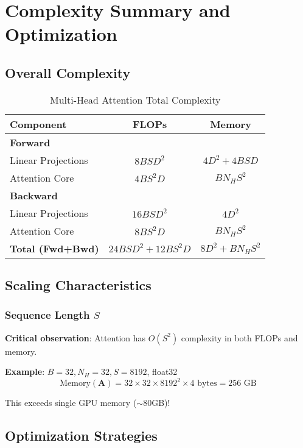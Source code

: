 \documentclass[10pt]{article}
\begin{document}
\section{Complexity Summary and Optimization}
\label{sec:summary}

\subsection{Overall Complexity}

\begin{table}[h]
\centering
\caption{Multi-Head Attention Total Complexity}
\begin{tabular}{lcc}
\toprule
\textbf{Component} & \textbf{FLOPs} & \textbf{Memory} \\
\midrule
\textbf{Forward} & & \\
\quad Linear Projections & $8BSD^2$ & $4D^2 + 4BSD$ \\
\quad Attention Core & $4BS^2D$ & $BN_H S^2$ \\
\midrule
\textbf{Backward} & & \\
\quad Linear Projections & $16BSD^2$ & $4D^2$ \\
\quad Attention Core & $8BS^2D$ & $BN_H S^2$ \\
\midrule
\textbf{Total (Fwd+Bwd)} & $24BSD^2 + 12BS^2D$ & $8D^2 + BN_H S^2$ \\
\bottomrule
\end{tabular}
\end{table}

\subsection{Scaling Characteristics}

\subsubsection{Sequence Length $S$}

\textbf{Critical observation}: Attention has $O(S^2)$ complexity in both FLOPs and memory.

\textbf{Example}: $B=32, N_H=32, S=8192$, float32
\begin{equation}
\text{Memory}(\mathbf{A}) = 32 \times 32 \times 8192^2 \times 4 \text{ bytes} = 256 \text{ GB}
\end{equation}

This exceeds single GPU memory ($\sim$80GB)!

\subsection{Optimization Strategies}
\end{document}
